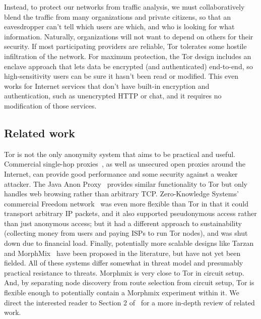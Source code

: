 \documentclass{llncs}
\begin{document}
Instead, to protect our networks from traffic analysis, we must
collaboratively blend the traffic from many organizations and private
citizens, so that an eavesdropper can't tell which users are which,
and who is looking for what information.  %
Naturally, organizations will not want to depend on others for their
security.  If most participating providers are reliable, Tor tolerates
some hostile infiltration of the network.  For maximum protection,
the Tor design includes an enclave approach that lets data be encrypted
(and authenticated) end-to-end, so high-sensitivity users can be sure it
hasn't been read or modified.  This even works for Internet services that
don't have built-in encryption and authentication, such as unencrypted
HTTP or chat, and it requires no modification of those services.

\subsection{Related work}
Tor is not the only anonymity system that aims to be practical and useful.
Commercial single-hop proxies~\cite{anonymizer}, as well as unsecured
open proxies around the Internet, can provide good
performance and some security against a weaker attacker. The Java
Anon Proxy~\cite{web-mix} provides similar functionality to Tor but only
handles web browsing rather than arbitrary TCP\@.
Zero-Knowledge Systems' commercial Freedom
network~\cite{freedom21-security} was even more flexible than Tor in
that it could transport arbitrary IP packets, and it also supported
pseudonymous access rather than just anonymous access; but it had
a different approach to sustainability (collecting money from users
and paying ISPs to run Tor nodes), and was shut down due to financial
load.  Finally, potentially
more scalable designs like Tarzan~\cite{tarzan:ccs02} and
MorphMix~\cite{morphmix:fc04} have been proposed in the literature, but
have not yet been fielded. All of these systems differ somewhat
in threat model and presumably practical resistance to threats.
Morphmix is very close to Tor in circuit setup. And, by separating
node discovery from route selection from circuit setup, Tor is
flexible enough to potentially contain a Morphmix experiment within
it. We direct the interested reader to Section
2 of~\cite{tor-design} for a more in-depth review of related work.
\end{document}
